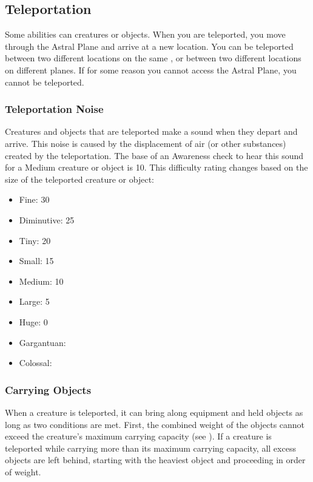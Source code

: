     \subsection{Teleportation}\label{Teleportation}
        Some abilities can  creatures or objects.
        When you are teleported, you move through the Astral Plane and arrive at a new location.
        You can be teleported between two different locations on the same , or between two different locations on different planes.
        If for some reason you cannot access the Astral Plane, you cannot be teleported.

        \subsubsection{Teleportation Noise}\label{Teleportation Noise}
            Creatures and objects that are teleported make a sound when they depart and arrive.
            This noise is caused by the displacement of air (or other substances) created by the teleportation.
            The base  of an Awareness check to hear this sound for a Medium creature or object is 10.
            This difficulty rating changes based on the size of the teleported creature or object:

            \begin{itemize}
                \item Fine: 30
                \item Diminutive: 25
                \item Tiny: 20
                \item Small: 15
                \item Medium: 10
                \item Large: 5
                \item Huge: 0
                \item Gargantuan: 
                \item Colossal: 
            \end{itemize}

        \subsubsection{Carrying Objects}
            When a creature is teleported, it can bring along equipment and held objects as long as two conditions are met.
            First, the combined weight of the objects cannot exceed the creature's maximum carrying capacity (see ).
            If a creature is teleported while carrying more than its maximum carrying capacity, all excess objects are left behind, starting with the heaviest object and proceeding in order of weight.

